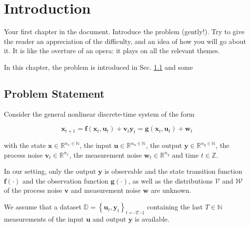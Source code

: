 \chapter{Introduction}
\label{sec:introduction}

Your first chapter in the document.
Introduce the problem (gently!). Try to give the reader an appreciation of the difficulty, and an idea of how you will go about it. It is like the overture of an opera: it plays on all the relevant themes.

In this chapter, the problem is introduced in Sec. \ref{Problem Statement} and some 

\section{Problem Statement} \label{Problem Statement}

Consider the general nonlinear discrete-time system of the form

\begin{subequations} \label{System equation}
\begin{equation}
\boldsymbol{x}_{t+1} = \boldsymbol{f} \left( \boldsymbol{x}_{t}, \boldsymbol{u}_t \right) + \boldsymbol{v}_{t}
\end{equation}
\begin{equation}
\boldsymbol{y}_{t} = \boldsymbol{g} \left( \boldsymbol{x}_{t}, \boldsymbol{u}_t \right) + \boldsymbol{w}_{t}
\end{equation}
\end{subequations}

with the state $\boldsymbol{x} \in \mathbb{R}^{n_x \in \mathbb{N}}$, the input $\boldsymbol{u} \in \mathbb{R}^{n_u \in \mathbb{N}}$, the output $\boldsymbol{y} \in \mathbb{R}^{n_y \in \mathbb{N}}$, the process noise $\boldsymbol{v}_{t} \in \mathbb{R}^{n_x}$, the measurement noise $\boldsymbol{w}_{t} \in \mathbb{R}^{n_y}$ and time $t \in \mathbb{Z}$. 

In our setting, only the output $\boldsymbol{y}$ is observable and the state transition function $\boldsymbol{f}(\cdot)$ and the observation function $\boldsymbol{g}(\cdot)$, as well as the distributions $\boldsymbol{\mathcal{V}}$ and $\boldsymbol{\mathcal{W}}$ of the process noise $\boldsymbol{v}$ and measurement noise $\boldsymbol{w}$ are unknown.

We assume that a dataset $\mathbb{D} = \left\{\boldsymbol{u}_{t}, \boldsymbol{y}_{t}\right\}_{t = \text{-}T:\text{-}1}$ containing the last $T \in \mathbb{N}$ measurements of the input $\boldsymbol{u}$ and output $\boldsymbol{y}$ is available.

